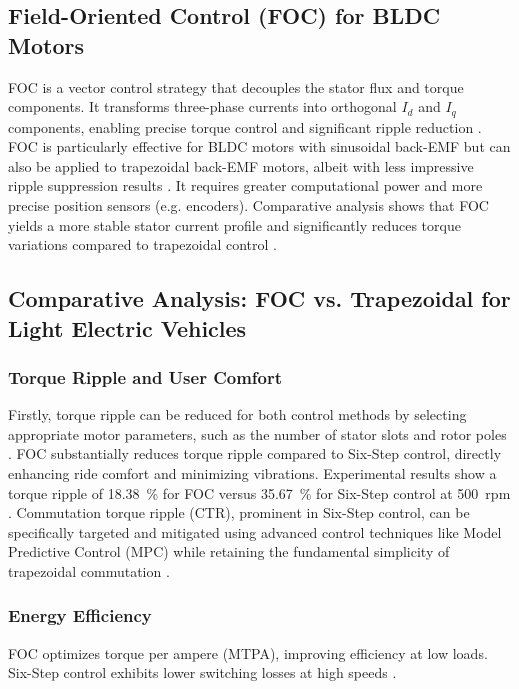 \subsection{Field-Oriented Control (FOC) for BLDC Motors}
FOC is a vector control strategy that decouples the stator flux and torque components. It transforms three-phase currents into orthogonal \( I_d \) and \( I_q \) components, enabling precise torque control and significant ripple reduction \cite{jomsa-nga_torque_2024}. FOC is particularly effective for BLDC motors with sinusoidal back-EMF but can also be applied to trapezoidal back-EMF motors, albeit with less impressive ripple suppression results \cite{li_quantitative_2019}. It requires greater computational power and more precise position sensors (e.g. encoders). Comparative analysis shows that FOC yields a more stable stator current profile and significantly reduces torque variations compared to trapezoidal control \cite{patil_analysis_2025}.


\subsection{Comparative Analysis: FOC vs. Trapezoidal for Light Electric Vehicles}

\subsubsection{Torque Ripple and User Comfort}
Firstly, torque ripple can be reduced for both control methods by selecting appropriate motor parameters, such as the number of stator slots and rotor poles \cite{gasc_conception_2004}.
FOC substantially reduces torque ripple compared to Six-Step control, directly enhancing ride comfort and minimizing vibrations. Experimental results show a torque ripple of \SI{18.38}{\percent} for FOC versus \SI{35.67}{\percent} for Six-Step control at 500~rpm \cite{jomsa-nga_torque_2024}. Commutation torque ripple (CTR), prominent in Six-Step control, can be specifically targeted and mitigated using advanced control techniques like Model Predictive Control (MPC) while retaining the fundamental simplicity of trapezoidal commutation \cite{mohammd_taher_new_2021}.

\subsubsection{Energy Efficiency}
FOC optimizes torque per ampere (MTPA), improving efficiency at low loads. Six-Step control exhibits lower switching losses at high speeds \cite{li_quantitative_2019}.

